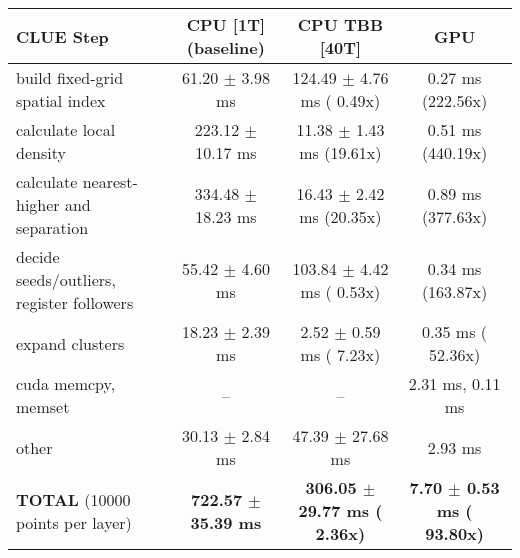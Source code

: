     \begin{tabular}{l|c|c|c}
    \hline
    CLUE Step                                 & CPU [1T] (baseline)         & CPU TBB [40T]                         & GPU                       \\ \hline
    build fixed-grid spatial index            &  61.20 $\pm$  3.98 ms       & 124.49 $\pm$  4.76 ms ( 0.49x)        &   0.27 ms (222.56x)       \\
    calculate local density                   & 223.12 $\pm$ 10.17 ms       &  11.38 $\pm$  1.43 ms (19.61x)        &   0.51 ms (440.19x)       \\
    calculate nearest-higher and separation   & 334.48 $\pm$ 18.23 ms       &  16.43 $\pm$  2.42 ms (20.35x)        &   0.89 ms (377.63x)       \\
    decide seeds/outliers, register followers &  55.42 $\pm$  4.60 ms       & 103.84 $\pm$  4.42 ms ( 0.53x)        &   0.34 ms (163.87x)       \\
    expand clusters                           &  18.23 $\pm$  2.39 ms       &   2.52 $\pm$  0.59 ms ( 7.23x)        &   0.35 ms ( 52.36x)       \\ \hline
    cuda memcpy, memset                       & --                          & --                                    &   2.31 ms,   0.11 ms      \\ 
    other                                     &  30.13 $\pm$  2.84 ms       &  47.39 $\pm$ 27.68 ms                 &   2.93 ms                 \\ \hline
    \textbf{TOTAL} (10000 points per layer)   & \textbf{722.57 $\pm$ 35.39 ms} & \textbf{306.05 $\pm$ 29.77 ms ( 2.36x)} & \textbf{  7.70 $\pm$  0.53 ms ( 93.80x)}  \\
    \hline 
    \end{tabular}
    \linebreak


